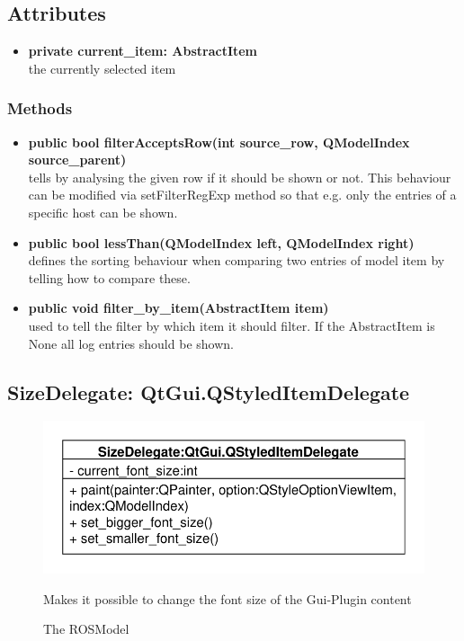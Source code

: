 \subsection{Attributes}
\begin{itemize}
  \item \textbf{private current\_item: AbstractItem}\\
  the currently selected item
\end{itemize}
\subsubsection{Methods}
\begin{itemize}
  \item \textbf{public bool filterAcceptsRow(int source\_row, QModelIndex
  source\_parent)}\\
  tells by analysing the given row if it should be shown or not. This behaviour can be modified via setFilterRegExp method so that e.g. only the entries of a specific host can be shown.
  \item \textbf{public bool lessThan(QModelIndex left, QModelIndex right)}\\
    defines the sorting behaviour when comparing two entries of model item by telling how to compare these.
  \item \textbf{public void filter\_by\_item(AbstractItem item)}\\
  used to tell the filter by which item it should filter. If the AbstractItem is None all log entries should be shown.
\end{itemize}

\subsection{SizeDelegate: QtGui.QStyledItemDelegate}
\begin{figure}[htbp]
	\begin{minipage}[t]{7cm}
		\vspace{0pt}
		\centering
		\includegraphics[scale=0.6]{./diagram_pictures/SizeDelegate.pdf}
		\caption{The ROSModel}
	\end{minipage}
	\hfill
	\begin{minipage}[t]{7cm}
		\vspace{10pt}
		Makes it possible to change the font size of the Gui-Plugin content
	\end{minipage}
\end{figure} 
